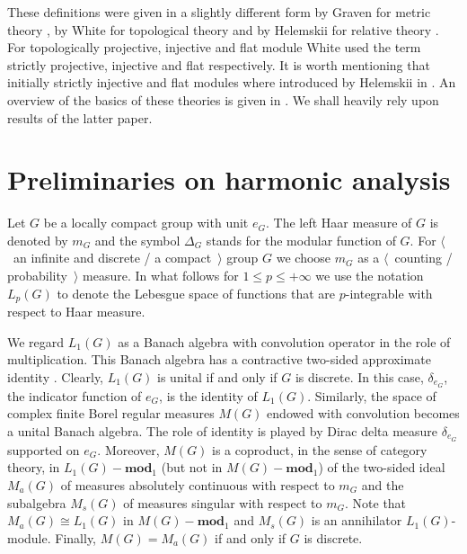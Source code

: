 \documentclass{article}
\theoremstyle{plain}
\theoremstyle{definition}
\newcommand{\isom}{\mathop{\mathbin{\cong}}}
\begin{document}
\begin{fulltext}
These definitions were given in a slightly different form by Graven 
for metric theory \cite{GravInjProjBanMod}, by White for topological theory
\cite{WhiteInjmoduAlg} and by Helemskii for relative theory \cite{HelemHomolDimNorModBanAlg}.
For topologically projective, injective and flat module White used the term strictly
projective, injective and flat respectively. It is worth mentioning that initially strictly
injective and flat modules where introduced by Helemskii in 
\cite[section VII.1]{HelBanLocConvAlg}. An overview of the basics of these theories is given in \cite{NemGeomProjInjFlatBanMod}. We shall heavily rely upon results of the latter paper.



\section{Preliminaries on harmonic analysis}
\label{SectionPreliminariesOnHarmonicAnalysis} 

Let $G$ be a locally compact group with unit $e_G$. The left Haar measure of $G$ is 
denoted by $m_G$ and the symbol $\Delta_G$ stands for the modular function of $G$. 
For $\langle$~an infinite and discrete / a  compact~$\rangle$ group $G$ we choose 
$m_G$ as a $\langle$~counting / probability~$\rangle$ measure. In what follows for 
$1\leq p\leq+\infty$ we use the notation $L_p(G)$ to denote the Lebesgue space of 
functions that are $p$-integrable with respect to Haar measure.

We regard $L_1(G)$ as a Banach algebra with convolution operator in the role of multiplication. 
This Banach algebra has a contractive two-sided approximate identity 
\cite[theorem 3.3.23]{DalBanAlgAutCont}. Clearly, $L_1(G)$ is unital if and only if 
$G$ is discrete. In this case, $\delta_{e_G}$, the indicator 
function of $e_G$, is the identity of $L_1(G)$. Similarly, the space of complex finite 
Borel regular measures $M(G)$ endowed with convolution becomes a unital Banach algebra. 
The role of identity is played by Dirac delta measure $\delta_{e_G}$ supported on $e_G$. 
Moreover, $M(G)$ is a coproduct, in the sense of category theory, in 
$L_1(G)-\mathbf{mod}_1$ (but not in $M(G)-\mathbf{mod}_1$) of the two-sided ideal 
$M_a(G)$ of measures absolutely continuous with respect to $m_G$ and 
the subalgebra $M_s(G)$ of measures singular with respect to $m_G$. Note that 
$M_a(G)\isom L_1(G)$ in $M(G)-\mathbf{mod}_1$ and $M_s(G)$ is an annihilator 
$L_1(G)$-module. Finally, $M(G)=M_a(G)$ if and only if $G$ is discrete. 


\end{fulltext}
\end{document}
